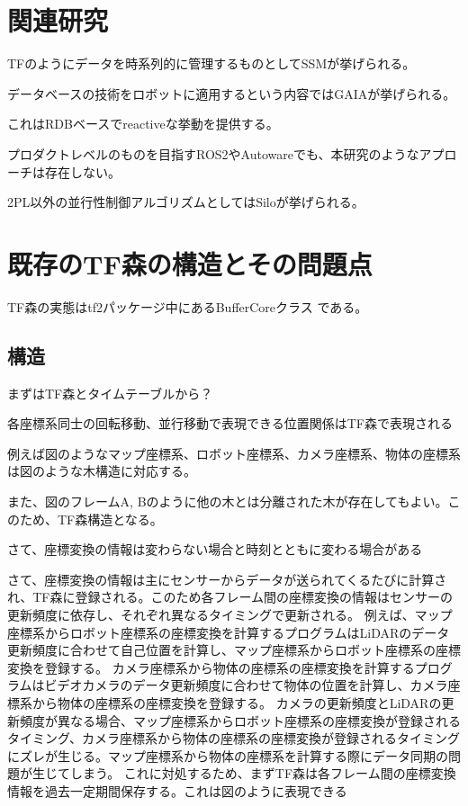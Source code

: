 \documentclass{jarticle}
\begin{document}
\begin{multicols}{2}
\section{関連研究}

TFのようにデータを時系列的に管理するものとしてSSMが挙げられる。

データベースの技術をロボットに適用するという内容ではGAIA\cite{gaia}が挙げられる。

これはRDBベースでreactiveな挙動を提供する。

プロダクトレベルのものを目指すROS2\cite{ros2}やAutoware\cite{autoware}でも、本研究のようなアプローチは存在しない。

2PL以外の並行性制御アルゴリズムとしてはSilo\cite{silo}が挙げられる。



\section{既存のTF森の構造とその問題点}

TF森の実態はtf2パッケージ中にあるBufferCoreクラス\cite{buffer-core} である。
\subsection{構造}
まずはTF森とタイムテーブルから？

各座標系同士の回転移動、並行移動で表現できる位置関係はTF森で表現される

例えば図のようなマップ座標系、ロボット座標系、カメラ座標系、物体の座標系は図のような木構造に対応する。

また、図のフレームA, Bのように他の木とは分離された木が存在してもよい。このため、TF森構造となる。


さて、座標変換の情報は変わらない場合と時刻とともに変わる場合がある

さて、座標変換の情報は主にセンサーからデータが送られてくるたびに計算され、TF森に登録される。このため各フレーム間の座標変換の情報はセンサーの更新頻度に依存し、それぞれ異なるタイミングで更新される。
例えば、マップ座標系からロボット座標系の座標変換を計算するプログラムはLiDARのデータ更新頻度に合わせて自己位置を計算し、マップ座標系からロボット座標系の座標変換を登録する。
カメラ座標系から物体の座標系の座標変換を計算するプログラムはビデオカメラのデータ更新頻度に合わせて物体の位置を計算し、カメラ座標系から物体の座標系の座標変換を登録する。
カメラの更新頻度とLiDARの更新頻度が異なる場合、マップ座標系からロボット座標系の座標変換が登録されるタイミング、カメラ座標系から物体の座標系の座標変換が登録されるタイミングにズレが生じる。マップ座標系から物体の座標系を計算する際にデータ同期の問題が生じてしまう。
これに対処するため、まずTF森は各フレーム間の座標変換情報を過去一定期間保存する。これは図のように表現できる


\end{multicols}
\end{document}
